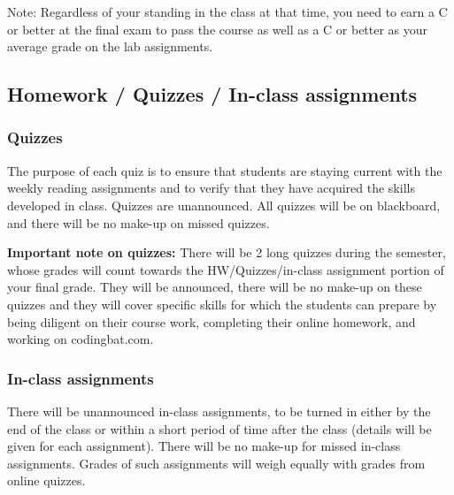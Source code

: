 \documentclass[12pt]{scrartcl}
\newcommand{\change}[2]{#2}
\begin{document}
Note: Regardless of your standing in the class at that time, you need to earn a C or better at the final exam to pass the course as well as a C or better as your average grade on the lab assignments. 

\subsection{Homework / Quizzes / In-class assignments}

\subsubsection{Quizzes}
The purpose of each quiz is to ensure that students are staying current with the weekly reading assignments and to verify that they have acquired the skills developed in class. 
Quizzes are unannounced. 
\change{}{All quizzes will be on blackboard, and there will be no make-up on missed quizzes.} 

\textbf{Important note on quizzes:} 
There will be 2 long quizzes during the semester, whose grades will count towards the HW/Quizzes/in-class assignment portion of your final grade. 
They will be announced, there will be no make-up on these quizzes and they will cover specific skills for which the students can prepare by being diligent on their course work, completing their online homework, and working on codingbat.com. 


\subsubsection{In-class assignments}
There will be unannounced in-class assignments, to be turned in either by the end of the class or within a short period of time after the class (details will be given for each assignment). 
There will be no make-up for missed in-class assignments. 
Grades of such assignments will weigh equally with grades from online quizzes. 
\end{document}
